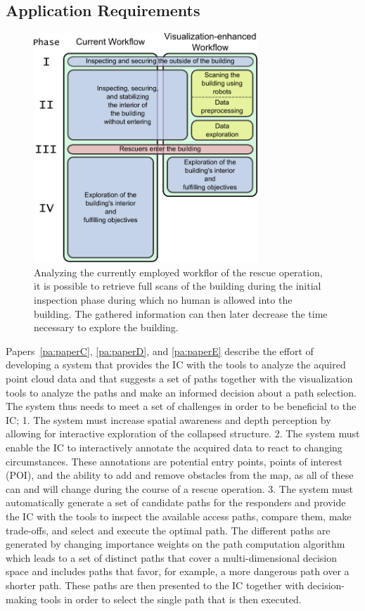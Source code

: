 \subsection{Application Requirements} \label{contributions:usar:requirements}
\begin{figure}
\centering
\includegraphics[width=0.75\textwidth]{figures/contributions/usar/workflow.pdf}
\caption{Analyzing the currently employed workflor of the rescue operation, it is possible to retrieve full scans of the building during the initial inspection phase during which no human is allowed into the building.  The gathered information can then later decrease the time necessary to explore the building.}
\label{contributions:usar:workflow}
\end{figure}

Papers~\ref{pa:paperC}, \ref{pa:paperD}, and \ref{pa:paperE} describe the effort of developing a system that provides the IC with the tools to analyze the aquired point cloud data and that suggests a set of paths together with the visualization tools to analyze the paths and make an informed decision about a path selection.  The system thus needs to meet a set of challenges in order to be beneficial to the IC; 1. The system must increase spatial awareness and depth perception by allowing for interactive exploration of the collapsed structure.  2. The system must enable the IC to interactively annotate the acquired data to react to changing circumstances.  These annotations are potential entry points, points of interest (POI), and the ability to add and remove obstacles from the map, as all of these can and will change during the course of a rescue operation.  3. The system must automatically generate a set of candidate paths for the responders and provide the IC with the tools to inspect the available access paths, compare them, make trade-offs, and select and execute the optimal path.  The different paths are generated by changing importance weights on the path computation algorithm which leads to a set of distinct paths that cover a multi-dimensional decision space and includes paths that favor, for example, a more dangerous path over a shorter path.  These paths are then presented to the IC together with decision-making tools in order to select the single path that is then executed.


